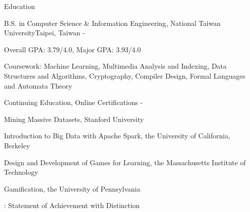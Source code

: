 \documentclass{cv}
\begin{document}
\begin{cvHeader} 
\end{cvHeader}


\begin{cvSection}{Education}

\begin{eduSubsection}{B.S. in Computer Science \& Information Engineering, National Taiwan University}{Taipei, Taiwan}{ - }

\item Overall GPA: 3.79/4.0, Major GPA: 3.93/4.0
\item Coursework: Machine Learning, Multimedia Analysis and Indexing, Data Structures and Algorithms, Cryptography, Compiler Design, Formal Languages and Automata Theory
\end{eduSubsection}

\begin{eduSubsection}{Continuing Education, Online Certifications}{}{ - }
\item *Mining Massive Datasets, Stanford University %
\item Introduction to Big Data with Apache Spark, the University of California, Berkeley %
\item Design and Development of Games for Learning, the Massachusetts Institute of Technology %
\item Gamification, the University of Pennsylvania %

\hfill {\footnotesize *: Statement of Achievement with Distinction}

\end{eduSubsection}

\end{cvSection}

\end{document}
